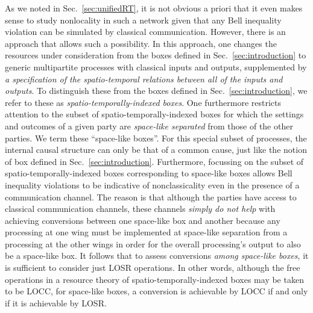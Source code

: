 \documentclass[prx,11pt,letterpaper,twocolumn,accepted=2023-11-27]{quantumarticle}
\newcommand{\rob}{\color{black}}
\newcommand{\blk}{\color{black}}
\theoremstyle{plain}
\theoremstyle{definition}
\begin{document}
As we noted in Sec.~\ref{sec:unifiedRT}, it is not obvious a priori that it even makes sense to study nonlocality in such a network given that any Bell inequality violation can be simulated by classical communication. 
\rob However, there is an approach that allows such a possibility.  In this approach, one changes the resources under consideration from the boxes defined in Sec.~\ref{sec:introduction} to generic multipartite processes with classical inputs and outputs, supplemented by {\em a specification of the spatio-temporal relations between all of the inputs and outputs}.  To distinguish these from the boxes defined in Sec.~\ref{sec:introduction}, we refer to these as {\em spatio-temporally-indexed boxes}.  One furthermore restricts attention to the subset of spatio-temporally-indexed boxes
  for which the settings and outcomes of a given party
 are {\em space-like separated} from those of the other parties.  We term these ``space-like boxes''. 
For this special subset of processes,
   the internal causal structure can only be that of a common cause, just like the notion of box defined in Sec.~\ref{sec:introduction}.  
Furthermore, focussing on the subset of spatio-temporally-indexed boxes corresponding to 
space-like boxes allows Bell inequality violations to be indicative of nonclassicality even in the presence of a communication channel.  The reason is that \blk although the parties have access to classical communication channels, these channels {\em simply do not help} with achieving  conversions between one space-like box and another because any processing at one wing must be implemented at space-like separation from a processing at the other wings in order for the overall processing's output to also be a space-like box.   \rob
It follows that to assess conversions {\em among space-like boxes}, it is sufficient to consider just LOSR operations.
 In other words, although the free operations in a resource theory of spatio-temporally-indexed boxes may be taken to be LOCC, 
  for space-like boxes, a conversion is achievable by LOCC
   if and only if it is achievable by LOSR. \blk
\end{document}
